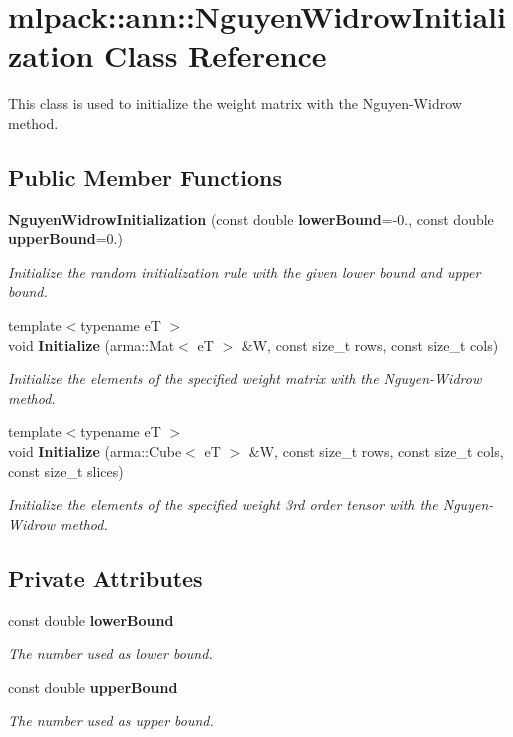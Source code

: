 \section{mlpack\+:\+:ann\+:\+:Nguyen\+Widrow\+Initialization Class Reference}
\label{classmlpack_1_1ann_1_1NguyenWidrowInitialization}


This class is used to initialize the weight matrix with the Nguyen-\/\+Widrow method.  


\subsection*{Public Member Functions}
\begin{DoxyCompactItemize}
\item 
{\bf Nguyen\+Widrow\+Initialization} (const double {\bf lower\+Bound}=-\/0., const double {\bf upper\+Bound}=0.)
\begin{DoxyCompactList}\small\item\em Initialize the random initialization rule with the given lower bound and upper bound. \end{DoxyCompactList}\item 
{\footnotesize template$<$typename eT $>$ }\\void {\bf Initialize} (arma\+::\+Mat$<$ eT $>$ \&W, const size\+\_\+t rows, const size\+\_\+t cols)
\begin{DoxyCompactList}\small\item\em Initialize the elements of the specified weight matrix with the Nguyen-\/\+Widrow method. \end{DoxyCompactList}\item 
{\footnotesize template$<$typename eT $>$ }\\void {\bf Initialize} (arma\+::\+Cube$<$ eT $>$ \&W, const size\+\_\+t rows, const size\+\_\+t cols, const size\+\_\+t slices)
\begin{DoxyCompactList}\small\item\em Initialize the elements of the specified weight 3rd order tensor with the Nguyen-\/\+Widrow method. \end{DoxyCompactList}\end{DoxyCompactItemize}
\subsection*{Private Attributes}
\begin{DoxyCompactItemize}
\item 
const double {\bf lower\+Bound}
\begin{DoxyCompactList}\small\item\em The number used as lower bound. \end{DoxyCompactList}\item 
const double {\bf upper\+Bound}
\begin{DoxyCompactList}\small\item\em The number used as upper bound. \end{DoxyCompactList}\end{DoxyCompactItemize}


